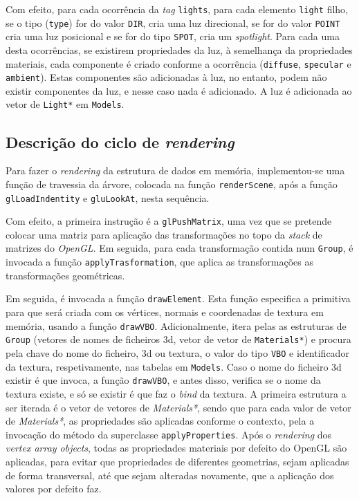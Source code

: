Com efeito, para cada ocorrência da \emph{tag} \texttt{lights}, para cada
elemento \texttt{light} filho, se o tipo (\texttt{type}) for do valor
\texttt{DIR}, cria uma luz direcional, se for do valor \texttt{POINT} cria uma
luz posicional e se for do tipo \texttt{SPOT}, cria um \emph{spotlight}. Para
cada uma desta ocorrências, se existirem propriedades da luz, à semelhança da
propriedades materiais, cada componente é criado conforme a ocorrência
(\texttt{diffuse}, \texttt{specular} e \texttt{ambient}). Estas
componentes são adicionadas à luz, no entanto, podem não existir componentes da
luz, e nesse caso nada é adicionado. A luz é adicionada ao vetor de
\texttt{Light*} em \texttt{Models}.  



\subsection{Descrição do ciclo de \emph{rendering}}



Para fazer o \emph{rendering} da estrutura de dados em memória, implementou-se
uma função de travessia da árvore, colocada na função \texttt{renderScene}, após
a função \texttt{glLoadIndentity} e \texttt{gluLookAt}, nesta sequência.

Com efeito, a primeira instrução é a \texttt{glPushMatrix}, uma vez que se
pretende colocar uma matriz para aplicação das transformações no topo da
\emph{stack} de matrizes do \emph{OpenGL}. Em seguida, para cada transformação
contida num \texttt{Group}, é invocada a função \texttt{applyTrasformation}, que
aplica as transformações as transformações geométricas.

Em seguida, é invocada a função \texttt{drawElement}. Esta função especifica a primitiva
para que será criada com os vértices, normais e coordenadas de textura em
memória, usando a função \texttt{drawVBO}. Adicionalmente, itera pelas as
estruturas de \texttt{Group} (vetores de nomes de ficheiros 3d, vetor de vetor
de \texttt{Materials*}) e procura pela chave do nome do ficheiro, 3d ou textura,
o valor do tipo \texttt{VBO} e identificador da textura, respetivamente, nas
tabelas em \texttt{Models}. Caso o nome do ficheiro 3d existir é que invoca,
a função \texttt{drawVBO}, e antes disso, verifica se o nome da textura existe,
e só se existir é que faz o \emph{bind} da textura. A primeira estrutura a ser
iterada é o vetor de vetores de \emph{Materials*}, sendo que para cada valor de
vetor de \emph{Materials*}, as propriedades são aplicadas conforme o contexto,
pela a invocação do método da superclasse \texttt{applyProperties}. Após
o \emph{rendering} dos \emph{vertex array objects}, todas as propriedades
materiais por defeito do OpenGL são aplicadas, para evitar que propriedades de
diferentes geometrias, sejam aplicadas de forma transversal, até que sejam
alteradas novamente, que a aplicação dos valores por defeito faz.   

